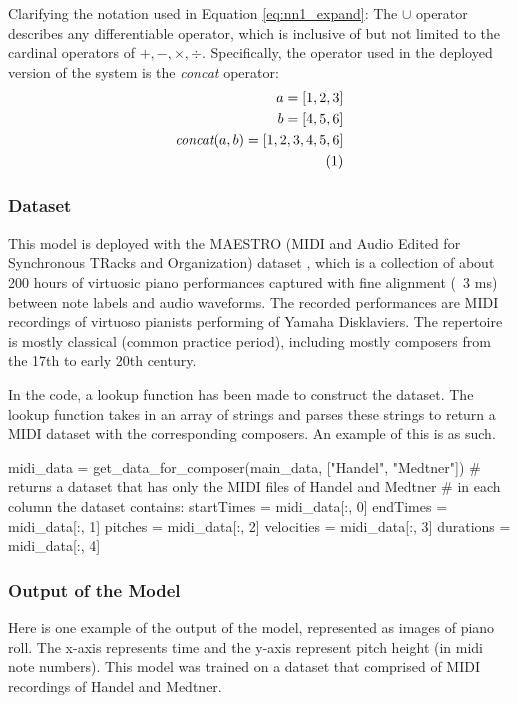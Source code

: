\documentclass{article}
\newcommand\numberthis{\addtocounter{equation}{1}\tag{\theequation}}
\begin{document}
Clarifying the notation used in Equation \ref{eq:nn1_expand}: The $\cup$ operator describes any differentiable operator, which is inclusive of but not limited to the cardinal operators of $+,-,\times,\div$. Specifically, the operator used in the deployed version of the system is the \textit{concat} operator:
\begin{align*}
	a = [1,2,3]                          \\
	b = [4,5,6]                          \\
	\textit{concat}(a,b) = [1,2,3,4,5,6] \\
	\numberthis
\end{align*}
\subsubsection{Dataset}
This model is deployed with the MAESTRO (MIDI and Audio Edited for Synchronous TRacks and Organization) dataset \citep{hawthorne2018enabling}, which is a collection of about 200 hours of virtuosic piano performances captured with fine alignment (~3 ms) between note labels and audio waveforms. The recorded performances are MIDI recordings of virtuoso pianists performing of Yamaha Disklaviers. The repertoire is mostly classical (common practice period), including mostly composers from the 17th to early 20th century.

In the code, a lookup function has been made to construct the dataset. The lookup function takes in an array of strings and parses these strings to return a MIDI dataset with the corresponding composers. An example of this is as such.

\begin{ffcode}
	midi_data = get_data_for_composer(main_data, ["Handel", "Medtner"])
	# returns a dataset that has only the MIDI files of Handel and Medtner
	# in each column the dataset contains:
	startTimes = midi_data[:, 0]
	endTimes = midi_data[:, 1]
	pitches = midi_data[:, 2]
	velocities = midi_data[:, 3]
	durations = midi_data[:, 4]
\end{ffcode}

\subsubsection{Output of the Model}
Here is one example of the output of the model, represented as images of piano roll. The x-axis represents time and the y-axis represent pitch height (in midi note numbers). This model was trained on a dataset that comprised of MIDI recordings of Handel and Medtner.
\end{document}

